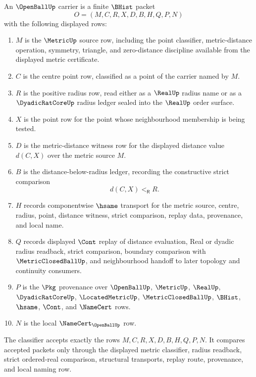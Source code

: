 \begin{definition}
\label{def:open-ball-carrier}
An $\OpenBallUp$ carrier is a finite $\BHist$ packet
$$
O=(M,C,R,X,D,B,H,Q,P,N)
$$
with the following displayed rows:
\begin{enumerate}
\item $M$ is the $\MetricUp$ source row, including the point classifier, metric-distance operation, symmetry, triangle, and zero-distance discipline available from the displayed metric certificate.
\item $C$ is the centre point row, classified as a point of the carrier named by $M$.
\item $R$ is the positive radius row, read either as a $\RealUp$ radius name or as a $\DyadicRatCoreUp$ radius ledger sealed into the $\RealUp$ order surface.
\item $X$ is the point row for the point whose neighbourhood membership is being tested.
\item $D$ is the metric-distance witness row for the displayed distance value $d(C,X)$ over the metric source $M$.
\item $B$ is the distance-below-radius ledger, recording the constructive strict comparison
$$
d(C,X)<_{\mathsf R}R .
$$
\item $H$ records componentwise $\hsame$ transport for the metric source, centre, radius, point, distance witness, strict comparison, replay data, provenance, and local name.
\item $Q$ records displayed $\Cont$ replay of distance evaluation, Real or dyadic radius readback, strict comparison, boundary comparison with $\MetricClosedBallUp$, and neighbourhood handoff to later topology and continuity consumers.
\item $P$ is the $\Pkg$ provenance over $\OpenBallUp$, $\MetricUp$, $\RealUp$, $\DyadicRatCoreUp$, $\LocatedMetricUp$, $\MetricClosedBallUp$, $\BHist$, $\hsame$, $\Cont$, and $\NameCert$ rows.
\item $N$ is the local $\NameCert_{\OpenBallUp}$ row.
\end{enumerate}
The classifier accepts exactly the rows $M,C,R,X,D,B,H,Q,P,N$. It compares accepted packets only through the displayed metric classifier, radius readback, strict ordered-real comparison, structural transports, replay route, provenance, and local naming row.
\end{definition}

